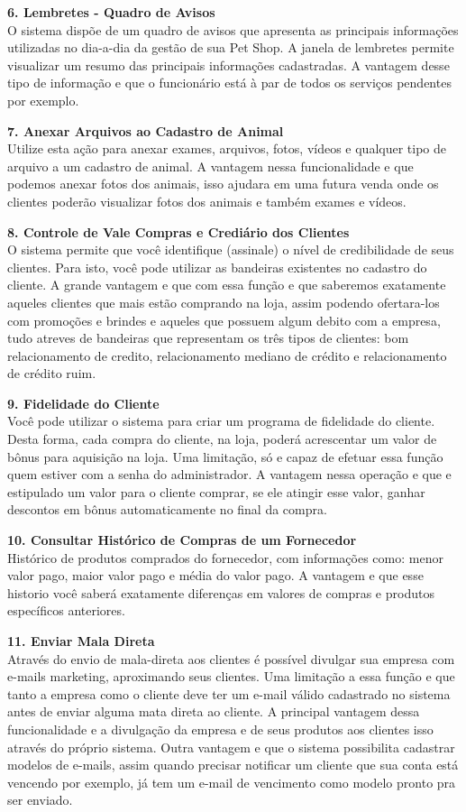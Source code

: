 \documentclass[12pt,openright,twoside,a4paper,english,french,spanish,brazil]{abntex2}
\begin{document}
\textbf{6.	Lembretes - Quadro de Avisos}\\
O sistema dispõe de um quadro de avisos que apresenta as principais informações utilizadas no dia-a-dia da gestão de sua Pet Shop. A janela de lembretes permite visualizar um resumo das principais informações cadastradas. A vantagem desse tipo de informação e que o funcionário está à par de todos os serviços pendentes por exemplo.

\textbf{7.	Anexar Arquivos ao Cadastro de Animal}\\
Utilize esta ação para anexar exames, arquivos, fotos, vídeos e qualquer tipo de arquivo a um cadastro de animal. A vantagem nessa funcionalidade e que podemos anexar fotos dos animais, isso ajudara em uma futura venda onde os clientes poderão visualizar fotos dos animais e também exames e vídeos.

\textbf{8.	Controle de Vale Compras e Crediário dos Clientes}\\
O sistema permite que você identifique (assinale) o nível de credibilidade de seus clientes. Para isto, você pode utilizar as bandeiras existentes no cadastro do cliente. A grande vantagem e que com essa função e que saberemos exatamente aqueles clientes que mais estão comprando na loja, assim podendo ofertara-los com promoções e brindes e aqueles que possuem algum debito com a empresa, tudo atreves de bandeiras que representam os três tipos de clientes: bom relacionamento de credito, relacionamento mediano de crédito e relacionamento de crédito ruim.

\textbf{9.	Fidelidade do Cliente}\\
Você pode utilizar o sistema para criar um programa de fidelidade do cliente. Desta forma, cada compra do cliente, na loja, poderá acrescentar um valor de bônus para aquisição na loja. Uma limitação, só e capaz de efetuar essa função quem estiver com a senha do administrador. A vantagem nessa operação e que e estipulado um valor para o cliente comprar, se ele atingir esse valor, ganhar descontos em bônus automaticamente no final da compra.

\textbf{10.	Consultar Histórico de Compras de um Fornecedor}\\
Histórico de produtos comprados do fornecedor, com informações como: menor valor pago, maior valor pago e média do valor pago. A vantagem e que esse historio você saberá exatamente diferenças em valores de compras e produtos específicos anteriores.
\newpage

\textbf{11.	Enviar Mala Direta}\\
Através do envio de mala-direta aos clientes é possível divulgar sua empresa com e-mails marketing, aproximando seus clientes. Uma limitação a essa função e que tanto a empresa como o cliente deve ter um e-mail válido cadastrado no sistema antes de enviar alguma mata direta ao cliente. A principal vantagem dessa funcionalidade e a divulgação da empresa e de seus produtos aos clientes isso através do próprio sistema. Outra vantagem e que o sistema possibilita cadastrar modelos de e-mails, assim quando precisar notificar um cliente que sua conta está vencendo por exemplo, já tem um e-mail de vencimento como modelo pronto pra ser enviado.
 
\end{document}
